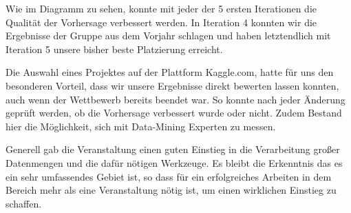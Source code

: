 Wie im Diagramm zu sehen, konnte mit jeder der 5 ersten Iterationen die Qualität der Vorhersage verbessert werden. In Iteration 4 konnten wir die Ergebnisse der Gruppe aus dem Vorjahr schlagen und haben letztendlich mit Iteration 5 unsere bisher beste Platzierung erreicht.

Die Auswahl eines Projektes auf der Plattform Kaggle.com, hatte für uns den besonderen Vorteil, dass wir unsere Ergebnisse direkt bewerten lassen konnten, auch wenn der Wettbewerb bereits beendet war. So konnte nach jeder Änderung geprüft werden, ob die Vorhersage verbessert wurde oder nicht. Zudem Bestand hier die Möglichkeit, sich mit Data-Mining Experten zu messen.

Generell gab die Veranstaltung einen guten Einstieg in die Verarbeitung großer Datenmengen und die dafür nötigen Werkzeuge. Es bleibt die Erkenntnis das es ein sehr umfassendes Gebiet ist, so dass für ein erfolgreiches Arbeiten in dem Bereich mehr als eine Veranstaltung nötig ist, um einen wirklichen Einstieg zu schaffen.